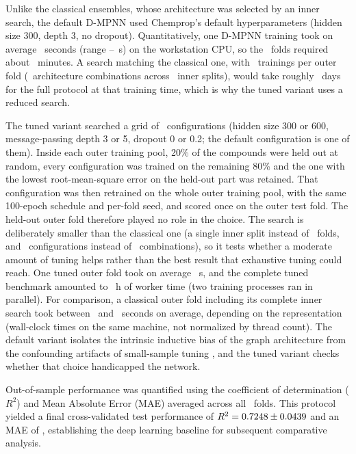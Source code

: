 Unlike the classical ensembles, whose architecture was selected by an inner search, the default D-MPNN used Chemprop's default hyperparameters (hidden size 300, depth 3, no dropout). Quantitatively, one D-MPNN training took on average \GnnFoldSecMean\ seconds (range \GnnFoldSecMin--\GnnFoldSecMax\ s) on the workstation CPU, so the \TotalOuterFolds\ folds required about \GnnTotalMin\ minutes. A search matching the classical one, with \GnnSearchFits\ trainings per outer fold (\NArchitectureCombos\ architecture combinations across \InnerKFolds\ inner splits), would take roughly \GnnSearchDaysTotal\ days for the full protocol at that training time, which is why the tuned variant uses a reduced search.

The tuned variant searched a grid of \GnnTunedNConfigs\ configurations (hidden size 300 or 600, message-passing depth 3 or 5, dropout 0 or 0.2; the default configuration is one of them). Inside each outer training pool, 20\% of the compounds were held out at random, every configuration was trained on the remaining 80\% and the one with the lowest root-mean-square error on the held-out part was retained. That configuration was then retrained on the whole outer training pool, with the same 100-epoch schedule and per-fold seed, and scored once on the outer test fold. The held-out outer fold therefore played no role in the choice. The search is deliberately smaller than the classical one (a single inner split instead of \InnerKFolds\ folds, and \GnnTunedNConfigs\ configurations instead of \NArchitectureCombos\ combinations), so it tests whether a moderate amount of tuning helps rather than the best result that exhaustive tuning could reach. One tuned outer fold took on average \GnnTunedFoldSecMean\ s, and the complete tuned benchmark amounted to \GnnTunedTotalHours\ h of worker time (two training processes ran in parallel). For comparison, a classical outer fold including its complete inner search took between \ClassicalFoldSecMin\ and \ClassicalFoldSecMax\ seconds on average, depending on the representation (wall-clock times on the same machine, not normalized by thread count). The default variant isolates the intrinsic inductive bias of the graph architecture from the confounding artifacts of small-sample tuning \cite{cawley2010, hadas2023}, and the tuned variant checks whether that choice handicapped the network.

Out-of-sample performance was quantified using the coefficient of determination ($R^2$) and Mean Absolute Error (MAE) averaged across all \TotalOuterFolds\ folds. This protocol yielded a final cross-validated test performance of $R^2 = 0.7248 \pm 0.0439$ and an MAE of \ChemPropDMPNNFoldMae, establishing the deep learning baseline for subsequent comparative analysis.

